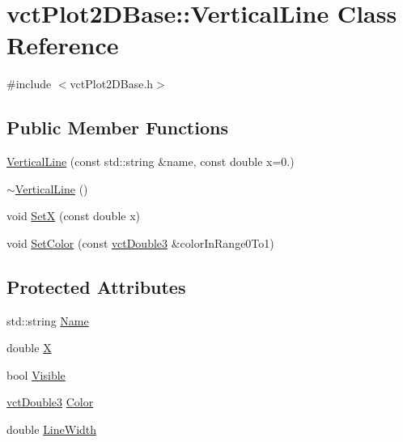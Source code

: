 \hypertarget{classvct_plot2_d_base_1_1_vertical_line}{}\section{vct\+Plot2\+D\+Base\+:\+:Vertical\+Line Class Reference}
\label{classvct_plot2_d_base_1_1_vertical_line}


{\ttfamily \#include $<$vct\+Plot2\+D\+Base.\+h$>$}

\subsection*{Public Member Functions}
\begin{DoxyCompactItemize}
\item 
\hyperlink{classvct_plot2_d_base_1_1_vertical_line_aeead77065b65afbd7ede2c0325fb5d3f}{Vertical\+Line} (const std\+::string \&name, const double x=0.)
\item 
\hyperlink{classvct_plot2_d_base_1_1_vertical_line_a315c1187f6ff9025bbc5484e504d1deb}{$\sim$\+Vertical\+Line} ()
\item 
void \hyperlink{classvct_plot2_d_base_1_1_vertical_line_a8f4efef79cd5e28102125fc208bf4ae7}{Set\+X} (const double x)
\item 
void \hyperlink{classvct_plot2_d_base_1_1_vertical_line_ac9abc49458204fba8a4f1dfa7c7df1ab}{Set\+Color} (const \hyperlink{vct_fixed_size_vector_types_8h_a4a89122c9d7f72c3f31fe8126e17c3af}{vct\+Double3} \&color\+In\+Range0\+To1)
\end{DoxyCompactItemize}
\subsection*{Protected Attributes}
\begin{DoxyCompactItemize}
\item 
std\+::string \hyperlink{classvct_plot2_d_base_1_1_vertical_line_a5aa26599db259440cfa96c967835417d}{Name}
\item 
double \hyperlink{classvct_plot2_d_base_1_1_vertical_line_a49c77c7144675b46d5a89342732b96eb}{X}
\item 
bool \hyperlink{classvct_plot2_d_base_1_1_vertical_line_a9f71e6ff1a3da3b6bf0f151720e277ca}{Visible}
\item 
\hyperlink{vct_fixed_size_vector_types_8h_a4a89122c9d7f72c3f31fe8126e17c3af}{vct\+Double3} \hyperlink{classvct_plot2_d_base_1_1_vertical_line_a45aab4a21d404c07843224e6c3c9ebd1}{Color}
\item 
double \hyperlink{classvct_plot2_d_base_1_1_vertical_line_a36cbedb02fb55b387933cd6db1782562}{Line\+Width}
\end{DoxyCompactItemize}
